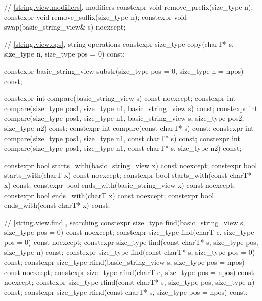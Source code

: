 \begin{codeblock}
{  // \ref{string.view.modifiers}, modifiers
  constexpr void remove_prefix(size_type n);
  constexpr void remove_suffix(size_type n);
  constexpr void swap(basic_string_view& s) noexcept;

  // \ref{string.view.ops}, string operations
  constexpr size_type copy(charT* s, size_type n, size_type pos = 0) const;

  constexpr basic_string_view substr(size_type pos = 0, size_type n = npos) const;

  constexpr int compare(basic_string_view s) const noexcept;
  constexpr int compare(size_type pos1, size_type n1, basic_string_view s) const;
  constexpr int compare(size_type pos1, size_type n1, basic_string_view s,
                        size_type pos2, size_type n2) const;
  constexpr int compare(const charT* s) const;
  constexpr int compare(size_type pos1, size_type n1, const charT* s) const;
  constexpr int compare(size_type pos1, size_type n1, const charT* s, size_type n2) const;

  constexpr bool starts_with(basic_string_view x) const noexcept;
  constexpr bool starts_with(charT x) const noexcept;
  constexpr bool starts_with(const charT* x) const;
  constexpr bool ends_with(basic_string_view x) const noexcept;
  constexpr bool ends_with(charT x) const noexcept;
  constexpr bool ends_with(const charT* x) const;

  // \ref{string.view.find}, searching
  constexpr size_type find(basic_string_view s, size_type pos = 0) const noexcept;
  constexpr size_type find(charT c, size_type pos = 0) const noexcept;
  constexpr size_type find(const charT* s, size_type pos, size_type n) const;
  constexpr size_type find(const charT* s, size_type pos = 0) const;
  constexpr size_type rfind(basic_string_view s, size_type pos = npos) const noexcept;
  constexpr size_type rfind(charT c, size_type pos = npos) const noexcept;
  constexpr size_type rfind(const charT* s, size_type pos, size_type n) const;
  constexpr size_type rfind(const charT* s, size_type pos = npos) const;

}
\end{codeblock}
